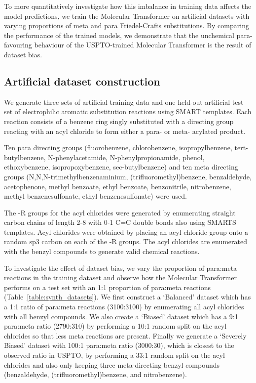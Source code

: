 To more quantitatively investigate how this imbalance in training data affects the model predictions, we train the Molecular Transformer on artificial datasets with varying proportions of meta and para Friedel-Crafts substitutions. By comparing the performance of the trained models, we demonstrate that the unchemical para-favouring behaviour of the USPTO-trained Molecular Transformer is the result of dataset bias.


\subsection{Artificial dataset construction}
We generate three sets of artificial training data and one held-out artificial test set of electrophilic aromatic substitution reactions using SMART templates. Each reaction consists of a benzene ring singly substituted with a directing group reacting with an acyl chloride to form either a para- or meta- acylated product. 

Ten para directing groups (fluorobenzene, chlorobenzene, isopropylbenzene, tert-butyl\-benzene, N-phenylacetamide, N-phenylpropionamide, phenol, ethoxybenzene, isopropoxybenzene, sec-butyl\-benzene) and ten meta directing groups (N,N,N-trimethylbenzenaminium, (trifluoromethyl)benzene, benzaldehyde, acetophenone, methyl benzoate, ethyl benzoate, benzonitrile, nitrobenzene, methyl benzenesulfonate, ethyl benzenesulfonate) were used.

The -R groups for the acyl chlorides were generated by enumerating straight carbon chains of length 2-8 with 0-1 C=C double bonds also using SMARTS templates. Acyl chlorides were obtained by placing an acyl chloride group onto a random sp3 carbon on each of the -R groups. The acyl chlorides are enumerated with the benzyl compounds to generate valid chemical reactions. 

To investigate the effect of dataset bias, we vary the proportion of para:meta reactions in the training dataset and observe how the Molecular Transformer performs on a test set with an 1:1 proportion of para:meta reactions (Table~\ref{table:synth_datasets}). We first construct a `Balanced' dataset which has a 1:1 ratio of para:meta reactions (3100:3100) by enumerating all acyl chlorides with all benzyl compounds.  We also create a `Biased' dataset which has a 9:1 para:meta ratio (2790:310) by performing a 10:1 random split on the acyl chlorides so that less meta reactions are present. Finally we generate a `Severely Biased' dataset with 100:1 para:meta ratio (3000:30), which is closest to the observed ratio in USPTO, by performing a 33:1 random split on the acyl chlorides and also only keeping three meta-directing benzyl compounds (benzaldehyde, (trifluoromethyl)benzene, and nitrobenzene).

